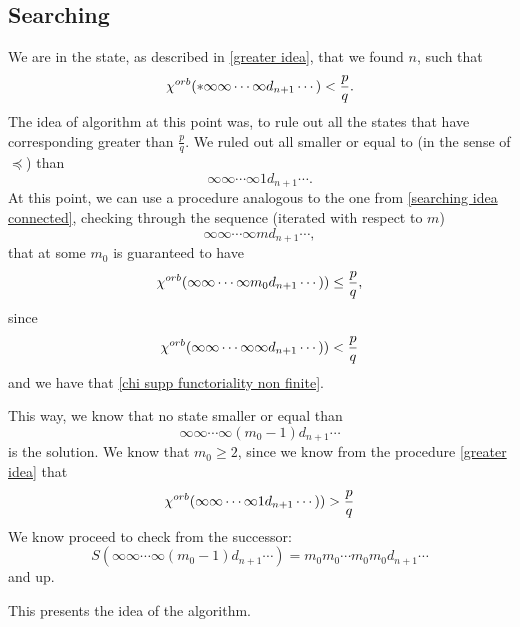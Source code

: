 \subsection{Searching}\label{searching mode idea}
We are in the state, as described in \ref{greater idea}, that we found $n$, such that 
\begin{equation}
{\chi^{orb}(*\infty\infty \cdots \infty d_{n+1}\cdots)} < \frac{p}{q}.
\end{equation}
The idea of algorithm at this point was, to rule out all the states that have 
corresponding \Eoc greater than $\frac{p}{q}$. We ruled out all smaller or equal to
(in the sense of $\preceq$) than 
\begin{equation}
\infty\infty \cdots \infty 1d_{n+1}\cdots.
\end{equation}
At this point, we can use a procedure analogous to the one from 
\ref{searching idea connected}, checking through the sequence (iterated with respect to $m$)
\begin{equation}
\infty\infty \cdots \infty md_{n+1}\cdots,
\end{equation}
that at some $m_0$ is guaranteed to have
\begin{equation}
{\chi^{orb}(\infty\infty \cdots \infty m_0d_{n+1}\cdots))} \leq \frac{p}{q},
\end{equation}
since 
\begin{equation}
{\chi^{orb}(\infty\infty \cdots \infty \infty d_{n+1}\cdots))} < \frac{p}{q}
\end{equation}
and we have that \ref{chi supp functoriality non finite}. 

This way, we know that no state smaller or equal than 
\begin{equation}\label{searching state}
\infty\infty \cdots \infty (m_0-1) d_{n+1}\cdots
\end{equation}
is the solution. 
We know that $m_0 \geq 2$, since we know from  the procedure \ref{greater idea} that 
\begin{equation}
{\chi^{orb}(\infty\infty \cdots \infty 1 d_{n+1}\cdots))} > \frac{p}{q}
\end{equation}
We know proceed to check from the successor:
\begin{equation}
S(\infty\infty \cdots \infty (m_0-1) d_{n+1}\cdots) = m_0m_0\cdots m_0 m_0 d_{n+1}\cdots
\end{equation}
and 
up.

This presents the idea of the algorithm.

